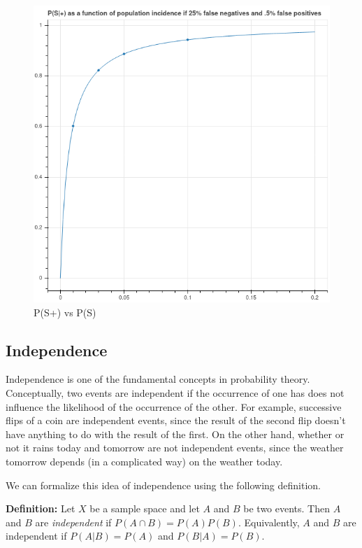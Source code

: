 \documentclass[
]{article}
\begin{document}
\begin{figure}
\hypertarget{fig:covidfn}{%
\centering
\includegraphics{../img/covidfn.png}
\caption{P(S\textbar+) vs P(S)}\label{fig:covidfn}
}
\end{figure}

\hypertarget{independence}{%
\subsection{Independence}\label{independence}}

Independence is one of the fundamental concepts in probability theory.
Conceptually, two events are independent if the occurrence of one has
does not influence the likelihood of the occurrence of the other. For
example, successive flips of a coin are independent events, since the
result of the second flip doesn't have anything to do with the result of
the first. On the other hand, whether or not it rains today and tomorrow
are not independent events, since the weather tomorrow depends (in a
complicated way) on the weather today.

We can formalize this idea of independence using the following
definition.

\textbf{Definition:} Let \(X\) be a sample space and let \(A\) and \(B\)
be two events. Then \(A\) and \(B\) are \emph{independent} if
\(P(A\cap B)=P(A)P(B)\). Equivalently, \(A\) and \(B\) are independent
if \(P(A|B)=P(A)\) and \(P(B|A)=P(B)\).
\end{document}
